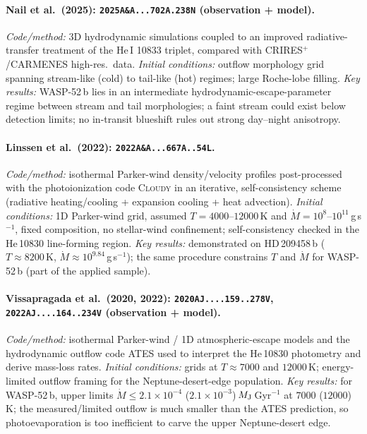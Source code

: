 \paragraph{Nail et al.\ (2025): \texttt{2025A\&A...702A.238N} (observation + model).}
\emph{Code/method:} 3D hydrodynamic simulations coupled to an improved radiative-transfer
treatment of the He\,I 10833 triplet, compared with CRIRES$^+$/CARMENES high-res.\ data.
\emph{Initial conditions:} outflow morphology grid spanning stream-like (cold) to
tail-like (hot) regimes; large Roche-lobe filling.
\emph{Key results:} WASP-52\,b lies in an intermediate hydrodynamic-escape-parameter
regime between stream and tail morphologies; a faint stream could exist below detection
limits; no in-transit blueshift rules out strong day--night anisotropy.

\paragraph{Linssen et al.\ (2022): \texttt{2022A\&A...667A..54L}.}
\emph{Code/method:} isothermal Parker-wind density/velocity profiles post-processed with
the photoionization code \textsc{Cloudy} in an iterative, self-consistency scheme
(radiative heating/cooling + expansion cooling + heat advection).
\emph{Initial conditions:} 1D Parker-wind grid, assumed $T=4000$--$12000$\,K and
$\dot M=10^{8}$--$10^{11}$\,g\,s$^{-1}$, fixed composition, no stellar-wind confinement;
self-consistency checked in the He\,10830 line-forming region.
\emph{Key results:} demonstrated on HD\,209458\,b ($T\approx8200$\,K,
$\dot M\approx10^{9.84}$\,g\,s$^{-1}$); the same procedure constrains $T$ and $\dot M$ for
WASP-52\,b (part of the applied sample).

\paragraph{Vissapragada et al.\ (2020, 2022): \texttt{2020AJ....159..278V},
\texttt{2022AJ....164..234V} (observation + model).}
\emph{Code/method:} isothermal Parker-wind / 1D atmospheric-escape models and the
hydrodynamic outflow code \textsc{ATES} used to interpret the He\,10830 photometry and
derive mass-loss rates.
\emph{Initial conditions:} grids at $T\approx7000$ and $12000$\,K; energy-limited
outflow framing for the Neptune-desert-edge population.
\emph{Key results:} for WASP-52\,b, upper limits
$\dot M\le2.1\times10^{-4}$ ($2.1\times10^{-3}$)\,$M_{\rm J}$\,Gyr$^{-1}$ at
$7000$ ($12000$)\,K; the measured/limited outflow is much smaller than the \textsc{ATES}
prediction, so photoevaporation is too inefficient to carve the upper Neptune-desert edge.

